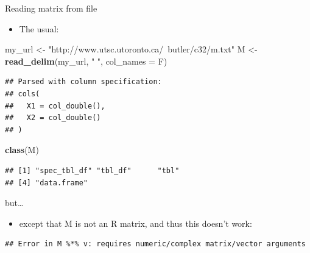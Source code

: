 \documentclass[
  ignorenonframetext,
]{beamer}
\newenvironment{Shaded}{\begin{snugshade}}{\end{snugshade}}
\newcommand{\DataTypeTok}[1]{\textcolor[rgb]{0.13,0.29,0.53}{#1}}
\newcommand{\DecValTok}[1]{\textcolor[rgb]{0.00,0.00,0.81}{#1}}
\newcommand{\KeywordTok}[1]{\textcolor[rgb]{0.13,0.29,0.53}{\textbf{#1}}}
\newcommand{\NormalTok}[1]{#1}
\newcommand{\OperatorTok}[1]{\textcolor[rgb]{0.81,0.36,0.00}{\textbf{#1}}}
\newcommand{\StringTok}[1]{\textcolor[rgb]{0.31,0.60,0.02}{#1}}
\providecommand{\tightlist}{%
  \setlength{\itemsep}{0pt}\setlength{\parskip}{0pt}}
\begin{document}
\begin{frame}[fragile]{Reading matrix from file}
\protect\hypertarget{reading-matrix-from-file}{}

\begin{itemize}
\tightlist
\item
  The usual:
\end{itemize}

\begin{Shaded}
\begin{Highlighting}[]
\NormalTok{my_url <-}\StringTok{ "http://www.utsc.utoronto.ca/~butler/c32/m.txt"}
\NormalTok{M <-}\StringTok{ }\KeywordTok{read_delim}\NormalTok{(my_url, }\StringTok{" "}\NormalTok{, }\DataTypeTok{col_names =}\NormalTok{ F)}
\end{Highlighting}
\end{Shaded}

\begin{verbatim}
## Parsed with column specification:
## cols(
##   X1 = col_double(),
##   X2 = col_double()
## )
\end{verbatim}

\begin{Shaded}
\begin{Highlighting}[]
\KeywordTok{class}\NormalTok{(M)}
\end{Highlighting}
\end{Shaded}

\begin{verbatim}
## [1] "spec_tbl_df" "tbl_df"      "tbl"        
## [4] "data.frame"
\end{verbatim}

\end{frame}

\begin{frame}[fragile]{but\ldots{}}
\protect\hypertarget{but-1}{}

\begin{itemize}
\tightlist
\item
  except that M is not an R matrix, and thus this doesn't work:
\end{itemize}

\begin{Shaded}
\end{Shaded}

\begin{verbatim}
## Error in M %*% v: requires numeric/complex matrix/vector arguments
\end{verbatim}

\end{frame}
\end{document}

